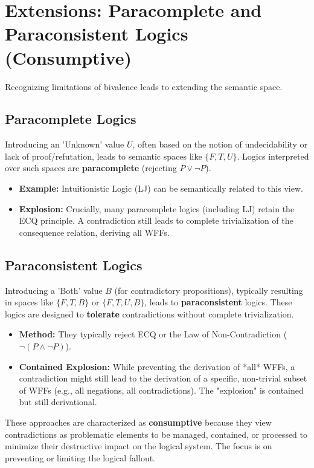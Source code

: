 	\section{Extensions: Paracomplete and Paraconsistent Logics (Consumptive)}
	
	Recognizing limitations of bivalence leads to extending the semantic space.
	
	\subsection{Paracomplete Logics}
	Introducing an 'Unknown' value $U$, often based on the notion of undecidability or lack of proof/refutation, leads to semantic spaces like $\{F, T, U\}$. Logics interpreted over such spaces are \textbf{paracomplete} (rejecting $P \lor \neg P$).
	\begin{itemize}
		\item \textbf{Example:} Intuitionistic Logic (LJ) can be semantically related to this view.
		\item \textbf{Explosion:} Crucially, many paracomplete logics (including LJ) retain the ECQ principle. A contradiction still leads to complete trivialization of the consequence relation, deriving all WFFs.
	\end{itemize}
	
	\subsection{Paraconsistent Logics}
	Introducing a 'Both' value $B$ (for contradictory propositions), typically resulting in spaces like $\{F, T, B\}$ or $\{F, T, U, B\}$, leads to \textbf{paraconsistent} logics. These logics are designed to \textbf{tolerate} contradictions without complete trivialization.
	\begin{itemize}
		\item \textbf{Method:} They typically reject ECQ or the Law of Non-Contradiction ($\neg(P \land \neg P)$).
		\item \textbf{Contained Explosion:} While preventing the derivation of *all* WFFs, a contradiction might still lead to the derivation of a specific, non-trivial subset of WFFs (e.g., all negations, all contradictions). The "explosion" is contained but still derivational.
	\end{itemize}
	
	These approaches are characterized as \textbf{consumptive} because they view contradictions as problematic elements to be managed, contained, or processed to minimize their destructive impact on the logical system. The focus is on preventing or limiting the logical fallout.
	
